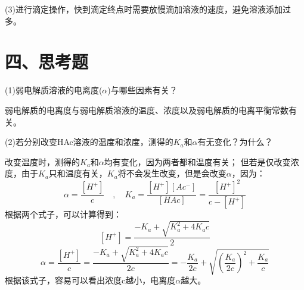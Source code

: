 \documentclass[a4paper,12pt]{article}
\begin{document}
(3)进行滴定操作，快到滴定终点时需要放慢滴加溶液的速度，避免溶液添加过多。

\section*{四、思考题}

(1)弱电解质溶液的电离度($\alpha$)与哪些因素有关？

弱电解质的电离度与弱电解质溶液的温度、浓度以及弱电解质的电离平衡常数有关。

(2)若分别改变HAc溶液的温度和浓度，测得的$K_a$和$\alpha$有无变化？为什么？

改变温度时，测得的$K_a$和$\alpha$均有变化，因为两者都和温度有关；
但若是仅改变浓度，由于$K_a$只和温度有关，$K_a$将不会发生改变，但是会改变$\alpha$，因为：
$$
\alpha=\frac{[H^+]}{c}\quad,\quad K_a=\frac{[H^+]{[Ac^-]}}{[HAc]}=\frac{[H^+]^2}{c-[H^+]}
$$
根据两个式子，可以计算得到：
$$
[H^+]=\frac{-K_a+\sqrt{K_a^2+4K_ac}}{2}
$$$$
\alpha=\frac{[H^+]}{c}=\frac{-K_a+\sqrt{K_a^2+4K_ac}}{2c}=-\frac{K_a}{2c}+\sqrt{(\frac{K_a}{2c})^2+\frac{K_a}{c}}
$$
根据该式子，容易可以看出浓度c越小，电离度$\alpha$越大。



\end{document}
